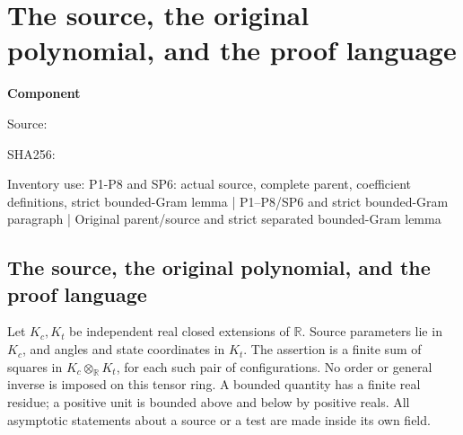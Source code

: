 \chapter{The source, the original polynomial, and the proof language}
\label{component:p472f434581f3}
\noindent\textbf{Component }\par
{\small\noindent Source: \par}
{\small\noindent SHA256: \par}
{\small\noindent Inventory use: P1-P8 and SP6: actual source, complete parent, coefficient definitions, strict bounded-Gram lemma | P1--P8/SP6 and strict bounded-Gram paragraph | Original parent/source and strict separated bounded-Gram lemma\par}
\medskip
\section{The source, the original polynomial, and the proof language}

Let $K_c,K_t$ be independent real closed extensions of $\mathbb R$.
Source parameters lie in $K_c$, and angles and state coordinates in
$K_t$. The assertion is a finite sum of squares in
$K_c\otimes_{\mathbb R}K_t$, for each such pair of configurations.
No order or general inverse is imposed on this tensor ring.
A bounded quantity has a finite real residue; a positive unit is
bounded above and below by positive reals. All asymptotic statements
about a source or a test are made inside its own field.


